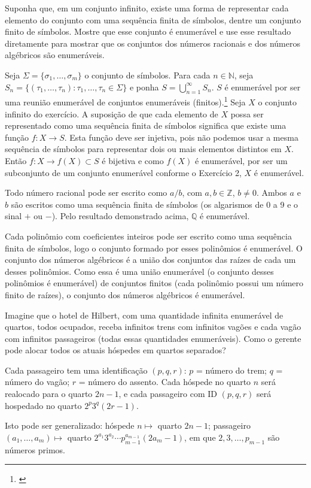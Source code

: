 \begin{exercicio}
	Suponha que, em um conjunto infinito, existe uma forma de representar cada elemento do conjunto com uma sequência finita de símbolos, dentre um conjunto finito de símbolos. Mostre que esse conjunto é enumerável e use esse resultado diretamente para mostrar que os conjuntos dos números racionais e dos números algébricos são enumeráveis.
\end{exercicio}
\begin{solucao}
	Seja $\Sigma=\{\sigma_1,\ldots,\sigma_m\}$ o conjunto de símbolos. Para cada $n\in\mathbb{N}$, seja $S_n=\{(\tau_1,\ldots,\tau_n):\tau_1,\ldots,\tau_n\in \Sigma\}$ e ponha $S=\bigcup_{n=1}^\infty S_n$. $S$ é enumerável por ser uma reunião enumerável de conjuntos enumeráveis (finitos).\footnote{\cite[p. 51]{Lima16}} Seja $X$ o conjunto infinito do exercício. A suposição de que cada elemento de $X$ possa ser representado como uma sequência finita de símbolos significa que existe uma função $f:X\to S$. Esta função deve ser injetiva, pois não podemos usar a mesma sequência de símbolos para representar dois ou mais elementos distintos em $X$. Então $f: X\to f(X)\subset S$ é bijetiva e como $f(X)$ é enumerável, por ser um subconjunto de um conjunto enumerável conforme o Exercício 2, $X$ é enumerável.
	
	Todo número racional pode ser escrito como $a/b$, com $a,b\in \mathbb{Z}$, $b\neq 0$. Ambos $a$ e $b$ são escritos como uma sequência finita de símbolos (os algarismos de 0 a 9 e o sinal $+$ ou $-$). Pelo resultado demonstrado acima, $\mathbb{Q}$ é enumerável.
	
	Cada polinômio com coeficientes inteiros pode ser escrito como uma sequência finita de símbolos, logo o conjunto formado por esses polinômios é enumerável. O conjunto dos números algébricos é a união dos conjuntos das raízes de cada um desses polinômios. Como essa é uma união enumerável (o conjunto desses polinômios é enumerável) de conjuntos finitos (cada polinômio possui um número finito de raízes), o conjunto dos números algébricos é enumerável.
\end{solucao}

\begin{exercicio}
	Imagine que o hotel de Hilbert, com uma quantidade infinita enumerável de quartos, todos ocupados, receba infinitos trens com infinitos vagões e cada vagão com infinitos passageiros (todas essas quantidades enumeráveis). Como o gerente pode alocar todos os atuais hóspedes em quartos separados?
\end{exercicio}
\begin{solucao}
	Cada passageiro tem uma identificação $(p,q,r)$: $p$ = número do trem; $q$ = número do vagão; $r$ = número do assento. Cada hóspede no quarto $n$ será realocado para o quarto $2n-1$, e cada passageiro com ID $(p,q,r)$ será hospedado no quarto $2^p3^q(2r-1)$.
	
	Isto pode ser generalizado: hóspede $n\mapsto$ quarto $2n-1$; passageiro $(a_1,\ldots,a_m)\mapsto$ quarto $2^{a_1}3^{a_2}\cdots p_{m-1}^{a_{m-1}}(2a_m-1)$, em que $2,3,\ldots,p_{m-1}$ são números primos.
\end{solucao}

